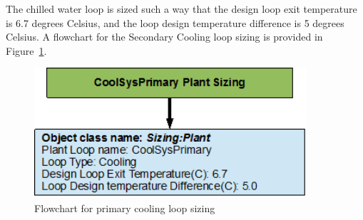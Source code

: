The chilled water loop is sized such a way that the design loop exit temperature is 6.7 degrees Celsius, and the loop design temperature difference is 5 degrees Celsius. A flowchart for the Secondary Cooling loop sizing is provided in Figure~\ref{fig:flowchart-for-primary-cooling-loop-sizing}.

\begin{figure}[htbp] %
\centering
\includegraphics[width=0.9\textwidth, height=0.9\textheight, keepaspectratio=true]{media/image060.png}
\caption{Flowchart for primary cooling loop sizing \protect \label{fig:flowchart-for-primary-cooling-loop-sizing}}
\end{figure}
